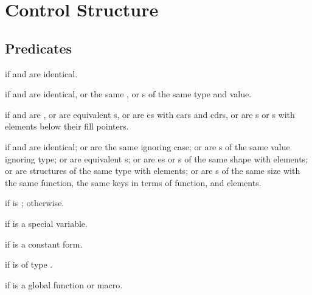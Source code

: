 %
%

\section{Control Structure}

\subsection{Predicates}
\begin{LIST}{1cm}

  {
  \retval{\T} if  and  are identical.
  }

  {
  \retval{\T} if  and 
  are identical, or the same , or s of the
  same type and value. 
  }

  {
  \retval{\T} if  and 
  are , or are equivalent s, or are es with
   cars and cdrs, or are s or s with
   elements below their fill pointers.
  }

  {
  \retval{\T} if  and  are identical; or are the
  same  ignoring case; or are s of the same
  value ignoring type; or are equivalent s; or are
  es or s of the same shape with 
  elements; or are structures of the same type with
   elements; or are s of the same size
  with the same  function, the same keys in terms of
   function, and  elements.
  }

  {
  \retval{\T} if  is \NIL; \retval{\NIL} otherwise.
  }

  {
    \retval{\T} if  is a special variable.
  }

  {
  \retval{\T} if  is a constant form.
  }

  {
  \retval{\T} if  is of type .
  }

  {
  \retval{\T} if  is a global function or macro.
  }


\end{LIST}


